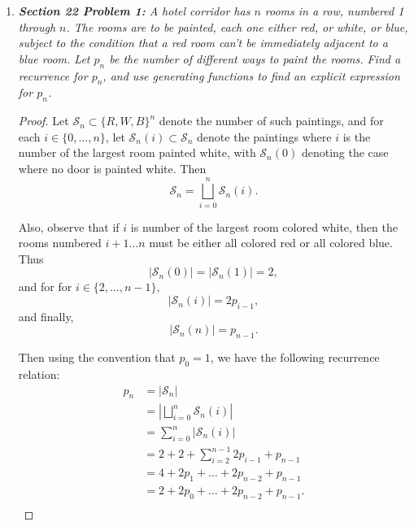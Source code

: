 \documentclass{article}
\begin{document}
\begin{enumerate}[label={\bf Q\arabic*:}]
  \item \it \textbf{Section 22 Problem 1:} A hotel corridor has $n$ rooms
    in a row, numbered 1 through $n$. The rooms are to be painted, each one
    either red, or white, or blue, subject to the condition that a red room
    can't be immediately adjacent to a blue room. Let $p_n$ be the number
    of different ways to paint the rooms. Find a recurrence for $p_n$, and
    use generating functions to find an explicit expression for $p_n$.

    \begin{proof}
      Let $\mathcal{S}_n\subset\{R,W,B\}^n$ denote the number of such
      paintings, and for each $i\in\{0,\ldots,n\}$, let
      $\mathcal{S}_n(i)\subset\mathcal{S}_n$ denote the paintings where $i$
      is the number of the largest room painted white, with
      $\mathcal{S}_n(0)$ denoting the case where no door is painted white.
      Then
      \[\mathcal{S}_n =\bigsqcup_{i=0}^n \mathcal{S}_n(i).\]

      Also, observe that if $i$ is number of the largest room colored
      white, then the rooms numbered $i+1\ldots n$ must be either all
      colored red or all colored blue. Thus
      \[|\mathcal{S}_n(0)|=|\mathcal{S}_n(1)|=2,\]
      and for for $i\in\{2,\ldots,n-1\}$,
      \[|\mathcal{S}_n(i)| =2p_{i-1},\]
      and finally,
      \[|\mathcal{S}_n(n)| =p_{n-1}.\]

      Then using the convention that $p_0=1$, we have the following
      recurrence relation:
      \begin{align*}
        p_n &=|\mathcal{S}_n|\\
        &=\left|\bigsqcup_{i=0}^n \mathcal{S}_n(i)\right|\\
        &=\sum_{i=0}^n|\mathcal{S}_n(i)|\\
        &=2+2+\sum_{i=2}^{n-1} 2p_{i-1}+p_{n-1}\\
        &=4+2p_1+\ldots+2p_{n-2}+p_{n-1}\\
        &=2+2p_0+\ldots+2p_{n-2}+p_{n-1}.\\
      \end{align*}


\end{proof}
\end{enumerate}
\end{document}
